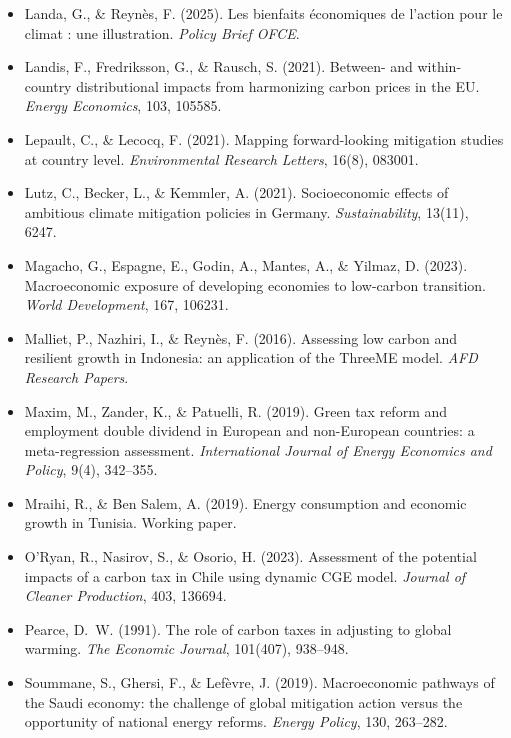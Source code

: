 \documentclass[12pt, a4paper]{article}
\begin{document}
\begin{itemize}[label={}, leftmargin=2em, itemindent=-2em, itemsep=2pt]
\item Landa, G., \& Reynès, F. (2025). Les bienfaits économiques de l'action pour le climat : une illustration. \textit{Policy Brief OFCE}.

\item Landis, F., Fredriksson, G., \& Rausch, S. (2021). Between- and within-country distributional impacts from harmonizing carbon prices in the EU. \textit{Energy Economics}, 103, 105585.

\item Lepault, C., \& Lecocq, F. (2021). Mapping forward-looking mitigation studies at country level. \textit{Environmental Research Letters}, 16(8), 083001.

\item Lutz, C., Becker, L., \& Kemmler, A. (2021). Socioeconomic effects of ambitious climate mitigation policies in Germany. \textit{Sustainability}, 13(11), 6247.

\item Magacho, G., Espagne, E., Godin, A., Mantes, A., \& Yilmaz, D. (2023). Macroeconomic exposure of developing economies to low-carbon transition. \textit{World Development}, 167, 106231.

\item Malliet, P., Nazhiri, I., \& Reynès, F. (2016). Assessing low carbon and resilient growth in Indonesia: an application of the ThreeME model. \textit{AFD Research Papers}.

\item Maxim, M., Zander, K., \& Patuelli, R. (2019). Green tax reform and employment double dividend in European and non-European countries: a meta-regression assessment. \textit{International Journal of Energy Economics and Policy}, 9(4), 342--355.

\item Mraihi, R., \& Ben Salem, A. (2019). Energy consumption and economic growth in Tunisia. Working paper.

\item O'Ryan, R., Nasirov, S., \& Osorio, H. (2023). Assessment of the potential impacts of a carbon tax in Chile using dynamic CGE model. \textit{Journal of Cleaner Production}, 403, 136694.

\item Pearce, D.~W. (1991). The role of carbon taxes in adjusting to global warming. \textit{The Economic Journal}, 101(407), 938--948.

\item Soummane, S., Ghersi, F., \& Lefèvre, J. (2019). Macroeconomic pathways of the Saudi economy: the challenge of global mitigation action versus the opportunity of national energy reforms. \textit{Energy Policy}, 130, 263--282.


\end{itemize}
\end{document}
